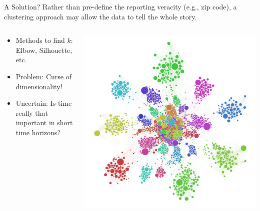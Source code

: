 \begin{frame}{A Solution?}
Rather than pre-define the reporting veracity (e.g., zip code), a clustering approach may allow the data to tell the whole story. 
\vspace{5pt}

  \begin{columns}
      \begin{column}{0.6\linewidth}
      \begin{itemize}
          \item Methods to find $k$: Elbow, Silhouette, etc.
          \vspace{-7pt}
          \item Problem: Curse of dimensionality!
          \vspace{-7pt}
          \item Uncertain: Is time really that important in short time horizons? 
      \end{itemize}
    \end{column}
    \begin{column}{0.45\linewidth}
        \includegraphics[scale = 0.12]{figures/high-dim_clustering.jpg}\\
    \end{column}
  \end{columns}
\end{frame}

